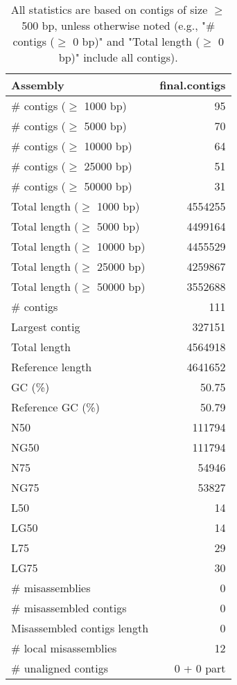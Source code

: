 \documentclass[12pt,a4paper]{article}
\begin{document}
\begin{table}[ht]
\begin{center}
\caption{All statistics are based on contigs of size $\geq$ 500 bp, unless otherwise noted (e.g., "\# contigs ($\geq$ 0 bp)" and "Total length ($\geq$ 0 bp)" include all contigs).}
\begin{tabular}{|l*{1}{|r}|}
\hline
Assembly & final.contigs \\ \hline
\# contigs ($\geq$ 1000 bp) & 95 \\ \hline
\# contigs ($\geq$ 5000 bp) & 70 \\ \hline
\# contigs ($\geq$ 10000 bp) & 64 \\ \hline
\# contigs ($\geq$ 25000 bp) & 51 \\ \hline
\# contigs ($\geq$ 50000 bp) & 31 \\ \hline
Total length ($\geq$ 1000 bp) & 4554255 \\ \hline
Total length ($\geq$ 5000 bp) & 4499164 \\ \hline
Total length ($\geq$ 10000 bp) & 4455529 \\ \hline
Total length ($\geq$ 25000 bp) & 4259867 \\ \hline
Total length ($\geq$ 50000 bp) & 3552688 \\ \hline
\# contigs & 111 \\ \hline
Largest contig & 327151 \\ \hline
Total length & 4564918 \\ \hline
Reference length & 4641652 \\ \hline
GC (\%) & 50.75 \\ \hline
Reference GC (\%) & 50.79 \\ \hline
N50 & 111794 \\ \hline
NG50 & 111794 \\ \hline
N75 & 54946 \\ \hline
NG75 & 53827 \\ \hline
L50 & 14 \\ \hline
LG50 & 14 \\ \hline
L75 & 29 \\ \hline
LG75 & 30 \\ \hline
\# misassemblies & 0 \\ \hline
\# misassembled contigs & 0 \\ \hline
Misassembled contigs length & 0 \\ \hline
\# local misassemblies & 12 \\ \hline
\# unaligned contigs & 0 + 0 part \\ \hline

\end{tabular}
\end{center}
\end{table}
\end{document}
